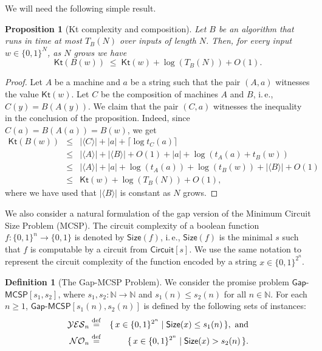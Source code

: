 \documentclass[11pt]{article}
\numberwithin{equation}{section}
\newtheorem{proposition}[theorem]{Proposition}
\theoremstyle{definition}
\newtheorem{definition}[theorem]{Definition}
\theoremstyle{plain}
\newcommand{\ie}{i.\,e.}
\newcommand{\eqdef}{\stackrel{\rm def}{=}}
\newcommand{\gapmcsp}{\mathsf{Gap}$-$\mathsf{MCSP}}
\newcommand{\Kt}{\mathsf{Kt}}
\begin{document}
We will need the following simple result.

\begin{proposition}[Kt complexity and composition]\label{p:composition}
Let $B$ be an algorithm that runs in time at most $T_B(N)$ over inputs of length $N$. Then, for every input $w \in \{0,1\}^N$, as $N$ grows we have
$$
\Kt(B(w)) \;\leq\;\Kt(w) + \log (T_B(N)) + O(1).
$$
\end{proposition}

\begin{proof}
Let $A$ be a machine and $a$ be a string such that the pair $(A,a)$ witnesses the value $\Kt(w)$. Let $C$ be the composition of machines $A$ and $B$, \ie, $C(y) = B(A(y))$. We claim that the pair $(C,a)$ witnesses the inequality in the conclusion of the proposition. Indeed, since $C(a) = B(A(a)) = B(w)$, we get
\begin{eqnarray}
\Kt(B(w)) & \leq & |\langle C \rangle| + |a| + \lceil \log t_C(a) \rceil \nonumber \\ 
 & \leq & |\langle A \rangle | + |\langle B \rangle| + O(1) + |a| + \log (t_A(a) + t_B(w)) \nonumber  \\
& \leq &  |\langle A \rangle | + |a| + \log (t_A(a)) + \log( t_B(w)) + |\langle B \rangle | + O(1) \nonumber \\
& \leq & \Kt(w) + \log (T_B(N)) + O(1), \nonumber
\end{eqnarray}
where we have used that $|\langle B \rangle |$ is constant as $N$ grows.
\end{proof}

We also consider a natural formulation of the gap version of the Minimum Circuit Size Problem (MCSP). The circuit complexity of a boolean function $f \colon \{0,1\}^n \to \{0,1\}$ is denoted by $\mathsf{Size}(f)$, \ie, $\mathsf{Size}(f)$ is the minimal $s$ such that $f$ is computable by a circuit from $\mathsf{Circuit}[s]$. We use the same notation to represent the circuit complexity of the function encoded by a string $x \in \{0,1\}^{2^n}$.

\begin{definition}[The Gap-MCSP Problem] \label{d:gapmcsp} We consider the promise problem $\gapmcsp[s_1,s_2]$, where $s_1,s_2 \colon \mathbb{N} \to \mathbb{N}$ and $s_1(n) \le s_2(n)$ for all $n \in \mathbb{N}$. For each $n \geq 1$, $\gapmcsp[s_1(n),s_2(n)]$ is defined by the following sets of instances:
\begin{eqnarray}
\mathcal{YES}_n & \eqdef & \{\,x \in \{0,1\}^{2^n} \mid \mathsf{Size}(x) \leq s_1(n)\,\},~\text{and} \nonumber \\
\mathcal{NO}_n & \eqdef & \{\,x \in \{0,1\}^{2^n} \mid \mathsf{Size}(x) > s_2(n)\,\}. \nonumber
\end{eqnarray}
\end{definition}
\end{document}
